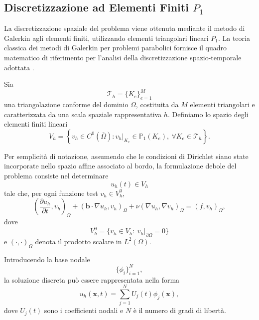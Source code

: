 \subsection{\texorpdfstring{Discretizzazione ad Elementi Finiti $P_1$}{Discretizzazione ad Elementi Finiti P1}}

\label{subsec:fem_discretization}

La discretizzazione spaziale del problema viene ottenuta mediante il metodo di Galerkin agli elementi finiti, utilizzando elementi triangolari lineari $P_1$. La teoria classica dei metodi di Galerkin per problemi parabolici fornisce il quadro matematico di riferimento per l'analisi della discretizzazione spazio-temporale adottata \citep{quarteroni2009the,thome1997galerkin}.

Sia
\[
\mathcal{T}_h=\{K_e\}_{e=1}^{M}
\]
una triangolazione conforme del dominio $\Omega$, costituita da $M$ elementi triangolari e caratterizzata da una scala spaziale rappresentativa $h$. Definiamo lo spazio degli elementi finiti lineari
\begin{equation}
V_h
=
\left\{
v_h\in C^0(\overline{\Omega}) :
v_h|_{K_e}\in\mathbb{P}_1(K_e),
\ \forall K_e\in\mathcal{T}_h
\right\}.
\label{eq:fem_space}
\end{equation}

Per semplicità di notazione, assumendo che le condizioni di Dirichlet siano state incorporate nello spazio affine associato al bordo, la formulazione debole del problema consiste nel determinare
\[
u_h(t)\in V_h
\]
tale che, per ogni funzione test $v_h\in V_h^0$,
\begin{equation}
\left(
\frac{\partial u_h}{\partial t},
v_h
\right)_{\Omega}
+
\left(
\mathbf{b}\cdot\nabla u_h,
v_h
\right)_{\Omega}
+
\nu
\left(
\nabla u_h,\nabla v_h
\right)_{\Omega}
=
\left(
f,v_h
\right)_{\Omega},
\label{eq:weak_form}
\end{equation}
dove
\[
V_h^0
=
\{v_h\in V_h:\ v_h|_{\partial\Omega}=0\}
\]
e $(\cdot,\cdot)_\Omega$ denota il prodotto scalare in $L^2(\Omega)$.

Introducendo la base nodale
\[
\{\phi_i\}_{i=1}^{N},
\]
la soluzione discreta può essere rappresentata nella forma
\begin{equation}
u_h(\mathbf{x},t)
=
\sum_{j=1}^{N}U_j(t)\phi_j(\mathbf{x}),
\label{eq:fem_expansion}
\end{equation}
dove $U_j(t)$ sono i coefficienti nodali e $N$ è il numero di gradi di libertà.

